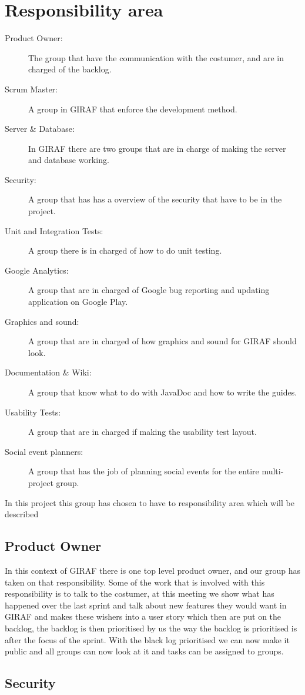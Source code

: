 \section{Responsibility area}

\begin{description}
    \item[Product Owner:] The group that have the communication with the costumer, and are in charged of the backlog. 
    \item[Scrum Master:] A group in GIRAF that enforce the development method.
    \item[Server \& Database:] In GIRAF there are two groups that are in charge of making the server and database working.
    \item[Security:] A group that has has a overview of the security that have to be in the project.
    \item[Unit and Integration Tests:] A group there is in charged of how to do unit testing. 
    \item[Google Analytics:] A group that are in charged of Google bug reporting and updating application on Google Play.
    \item[Graphics and sound:] A group that are in charged of how graphics and sound for GIRAF should look.
    \item[Documentation \& Wiki:] A group that know what to do with JavaDoc and how to write the guides.
    \item[Usability Tests:] A group that are in charged if making the usability test layout.
    \item[Social event planners:] A group that has the job of planning social events for the entire multi-project group.
\end{description}

In this project this group has chosen to have to responsibility area which will be described

\subsection{Product Owner}
In this context of GIRAF there is one top level product owner, and our group has taken on that responsibility. Some of the work that is involved with this responsibility is to talk to the costumer, at this meeting we show what has happened over the last sprint and talk about new features they would want in GIRAF and makes these wishers into a user story which then are put on the backlog, the backlog is then prioritised by us the way the backlog is prioritised is after the focus of the sprint. With the black log prioritised we can now make it public and all groups can now look at it and tasks can be assigned to groups.


\subsection{Security}